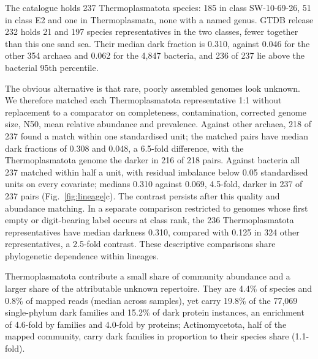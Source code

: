 \documentclass[11pt]{article}
\begin{document}
The catalogue holds 237 Thermoplasmatota species: 185 in class SW-10-69-26, 51 in class E2 and one
in Thermoplasmata, none with a named genus. GTDB release 232 holds 21 and 197 species
representatives in the two classes, fewer together than this one sand sea. Their median dark
fraction is 0.310, against 0.046 for the other 354 archaea and 0.062 for the 4{,}847 bacteria, and
236 of 237 lie above the bacterial 95th percentile.

The obvious alternative is that rare, poorly assembled genomes look unknown. We therefore matched
each Thermoplasmatota representative 1:1 without replacement to a comparator on completeness,
contamination, corrected genome size, N50, mean relative abundance and prevalence. Against other
archaea, 218 of 237 found a match within one standardised unit; the matched pairs have median dark
fractions of 0.308 and 0.048, a 6.5-fold difference, with the Thermoplasmatota genome the darker in
216 of 218 pairs. Against bacteria all 237 matched within half a unit, with residual imbalance below
0.05 standardised units on every covariate; medians 0.310 against 0.069, 4.5-fold, darker in 237 of
237 pairs (Fig.~\ref{fig:lineage}c). The contrast persists after this quality and abundance matching. In a separate comparison
restricted to genomes whose first empty or digit-bearing label occurs at class rank, the 236
Thermoplasmatota representatives have median darkness 0.310, compared with 0.125 in 324 other
representatives, a 2.5-fold contrast. These descriptive comparisons share phylogenetic dependence
within lineages.

Thermoplasmatota contribute a small share of community abundance and a larger share of the
attributable unknown repertoire. They are 4.4\%
of species and 0.8\% of mapped reads (median across samples), yet carry 19.8\% of the 77{,}069
single-phylum dark families and 15.2\% of dark protein instances, an enrichment of 4.6-fold by
families and 4.0-fold by proteins; Actinomycetota, half of the mapped community, carry dark families
in proportion to their species share (1.1-fold).
\end{document}
